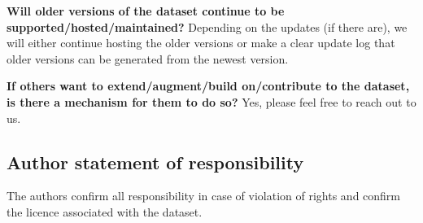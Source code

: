 \documentclass[lettersize,journal]{IEEEtran}
\begin{document}
\textbf{Will older versions of the dataset continue to be supported/hosted/maintained?} Depending on the updates (if there are), we will either continue hosting the older versions or make a clear update log that older versions can be generated from the newest version.

\textbf{If others want to extend/augment/build on/contribute to the dataset, is there a mechanism for them to do so?} Yes, please feel free to reach out to us.

\subsection{Author statement of responsibility}

The authors confirm all responsibility in case of violation of rights and confirm the licence associated with the dataset.







\begin{comment}

\begin{table}[h]
\centering
\caption{FGMAE-MS on DFC2020.}
\label{tab:dfc-ms}
\begin{tabular}{lccc}
\toprule
                       & OA            & mIoU          & AA          \\ \toprule
Supervised             & 86.0          & 52.2          & 66.6          \\ \cdashline{1-4}
MAE                    & 88.6          & 53.6          & 62.0          \\
FG-MAE (ours) & \textbf{89.3} & \textbf{55.0} & \textbf{65.1} \\ \bottomrule
\end{tabular}
\end{table}



\begin{table}[h]
\centering
\caption{FGMAE-SAR on DFC2020.}
\label{tab:dfc-sar}
\begin{tabular}{lccc}
\toprule
                       & OA            & mIoU          & AA          \\ \toprule
Supervised             & 87.4          & 49.5          & 59.5          \\ \cdashline{1-4}
MAE                    & 86.5          & 48.5          & 58.6          \\
FG-MAE (ours) & \textbf{87.7} & \textbf{50.1} & \textbf{59.7} \\ \bottomrule
\end{tabular}
\end{table}


\end{comment}
\end{document}
